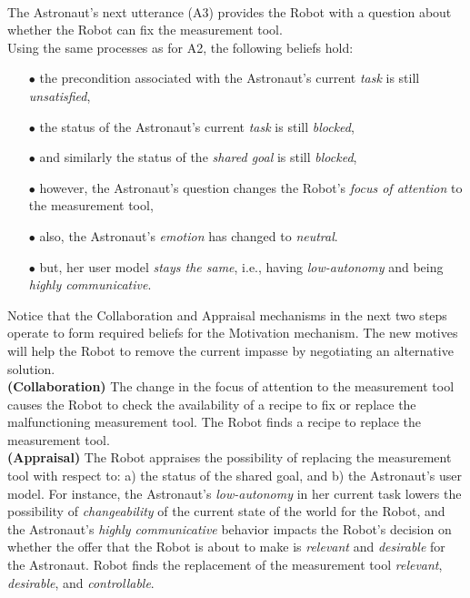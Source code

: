 \noindent{}\\

The Astronaut's next utterance (A3) provides the Robot with a question about
whether the Robot can fix the measurement tool.\\

\noindent Using the same processes as for A2, the following beliefs hold:

\begin{itemize}
  \item[$\bullet$] the precondition associated with the Astronaut's current
  \textit{task} is still \textit{unsatisfied},
  \item[$\bullet$] the status of the Astronaut's current \textit{task} is still
  \textit{blocked},
  \item[$\bullet$] and similarly the status of the \textit{shared goal} is
  still \textit{blocked},
  \item[$\bullet$] however, the Astronaut's question changes the Robot's
  \textit{focus of attention} to the measurement tool,
  \item[$\bullet$] also, the Astronaut's \textit{emotion} has changed to
  \textit{neutral}.
  \item[$\bullet$] but, her user model \textit{stays the same}, i.e., having
  \textit{low-autonomy} and being \textit{highly communicative}.
\end{itemize}

Notice that the Collaboration and Appraisal mechanisms in the next two steps
operate to form required beliefs for the Motivation mechanism. The new motives
will help the Robot to remove the current impasse by negotiating an alternative
solution.\\

\noindent\textbf{(Collaboration)} The change in the focus of attention to the
measurement tool causes the Robot to check the availability of a recipe to fix
or replace the malfunctioning measurement tool. The Robot finds a recipe to
replace the measurement tool.\\

\noindent\textbf{(Appraisal)} The Robot appraises the possibility of
replacing the measurement tool with respect to: a) the status of the shared
goal, and b) the Astronaut's user model. For instance, the Astronaut's
\textit{low-autonomy} in her current task lowers the possibility of
\textit{changeability} of the current state of the world for the Robot, and the
Astronaut's \textit{highly communicative} behavior impacts the Robot's decision
on whether the offer that the Robot is about to make is \textit{relevant} and
\textit{desirable} for the Astronaut. Robot finds the replacement of the
measurement tool \textit{relevant}, \textit{desirable}, and
\textit{controllable}.\\

